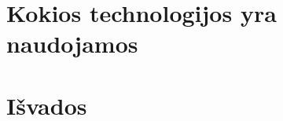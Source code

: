 \documentclass[12pt,a4paper]{article}
\begin{document}


\section{Kokios technologijos yra naudojamos}



\section{Išvados}



\newpage

\renewcommand\refname{Literatūros ir informacinių šaltinių sąrašas}

\nocite{han2011data}



\end{document}
